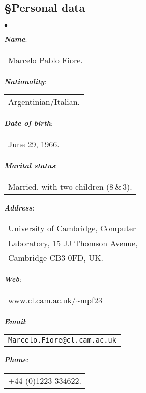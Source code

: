 \documentclass[11pt,twocolumn]{article}
\newenvironment{myitemize}
  {\begin{list}{$\bullet$}
  {\setlength{\topsep}{1pt}
   \setlength{\partopsep}{1pt}
   \setlength{\itemsep}{0pt}
   \setlength{\parsep}{0pt}
   \setlength{\leftmargin}{1em}
   \setlength{\labelwidth}{.5em}}}
  {\end{list}}
\newcommand{\hide}[1]{}
\newcommand{\hidenote}{\hide}
\newcommand{\SysL}{$L$}%
\begin{document}
\hidenote{System~{\SysL} internalisation of stacks?}

\hidenote{ssreflect?}

\clearpage
\setcounter{page}{1}

\subsection*{\S\enspace\thinspace Personal data}

\begin{myitemize}
\item
\textbf{\em Name}: 
\begin{tabular}[t]{l}
  Marcelo Pablo Fiore.
\end{tabular}

\item
\textbf{\em Nationality}: 
\begin{tabular}[t]{l}
  Argentinian/Italian.
\end{tabular}

\item
\textbf{\em Date of birth}: 
\begin{tabular}[t]{l}
  June 29, 1966.
\end{tabular}

\item
\textbf{\em Marital status}: 
\begin{tabular}[t]{l}
  Married, with two children (8\,\&\,3).
\end{tabular}

\item
\textbf{\em Address}: 
\begin{tabular}[t]{l}
  University of Cambridge, 
  Computer\\ Laboratory, 15 JJ Thomson
  Avenue,\\ Cambridge CB3 0FD, UK.
\end{tabular}

\item
\textbf{\em Web}: 
\begin{tabular}[t]{l}\small
  \url{www.cl.cam.ac.uk/~mpf23}
\end{tabular}

\item
\textbf{\em Email}: 
\begin{tabular}[t]{l}\small
  \texttt{Marcelo.Fiore@cl.cam.ac.uk}
\end{tabular}

\item
\textbf{\em Phone}: 
\begin{tabular}[t]{l}
  +44 (0)1223 334622.
\end{tabular}
\end{myitemize}
\end{document}
